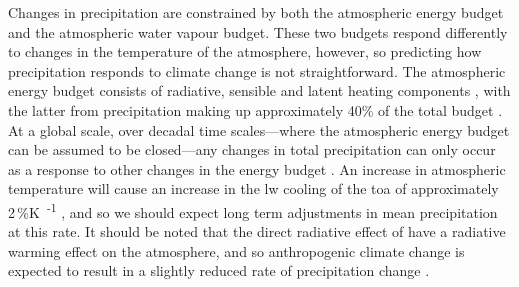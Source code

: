 Changes in precipitation are constrained by both the atmospheric energy budget and the atmospheric water vapour budget.
These two budgets respond differently to changes in the temperature of the atmosphere, however, so predicting how precipitation responds to climate change is not straightforward.
The atmospheric energy budget consists of radiative, sensible and latent heating components \citep{trenberth_earths_2009}, with the latter from precipitation making up approximately 40\% of the total budget \citep{rosenfeld_flood_2008}.
At a global scale, over decadal time scales---where the atmospheric energy budget can be assumed to be closed---any changes in total precipitation can only occur as a response to other changes in the energy budget \citep{allen_constraints_2002}.
An increase in atmospheric temperature will cause an increase in the \acrshort{lw} cooling of the \acrshort{toa} of approximately 2\,\%\unit{K\textsuperscript{-1}} \citep{held_robust_2006}, and so we should expect long term adjustments in mean precipitation at this rate.
It should be noted that the direct radiative effect of  have a radiative warming effect on the atmosphere, and so anthropogenic climate change is expected to result in a slightly reduced rate of precipitation change \citep{allen_constraints_2002}.

